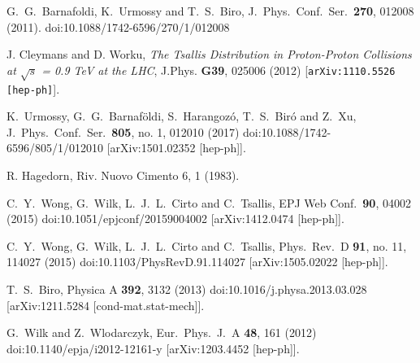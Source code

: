 \documentclass[aps,prd,twocolumn,showpacs,superscriptaddress,groupedaddress]{revtex4}  %
\begin{document}
\begin{thebibliography}{99}
  G.~G.~Barnafoldi, K.~Urmossy and T.~S.~Biro,
  J.\ Phys.\ Conf.\ Ser.\  {\bf 270}, 012008 (2011).
  doi:10.1088/1742-6596/270/1/012008

J. Cleymans and D. Worku,
\emph{The Tsallis Distribution in Proton-Proton Collisions 
at $\sqrt{s}$ = 0.9 TeV at the LHC},                     
J.Phys. {\bf G39}, 025006 (2012)
[{\tt arXiv:1110.5526 [hep-ph]}].

  K.~Urmossy, G.~G.~Barnaföldi, S.~Harangozó, T.~S.~Biró and Z.~Xu,
  J.\ Phys.\ Conf.\ Ser.\  {\bf 805}, no. 1, 012010 (2017)
  doi:10.1088/1742-6596/805/1/012010
  [arXiv:1501.02352 [hep-ph]].


 R. Hagedorn, Riv. Nuovo Cimento 6, 1 (1983).

  C.~Y.~Wong, G.~Wilk, L.~J.~L.~Cirto and C.~Tsallis,
  EPJ Web Conf.\  {\bf 90}, 04002 (2015)
  doi:10.1051/epjconf/20159004002
  [arXiv:1412.0474 [hep-ph]].

  C.~Y.~Wong, G.~Wilk, L.~J.~L.~Cirto and C.~Tsallis,
  Phys.\ Rev.\ D {\bf 91}, no. 11, 114027 (2015)
  doi:10.1103/PhysRevD.91.114027
  [arXiv:1505.02022 [hep-ph]].

  T.~S.~Biro,
  Physica A {\bf 392}, 3132 (2013)
  doi:10.1016/j.physa.2013.03.028
  [arXiv:1211.5284 [cond-mat.stat-mech]].

  G.~Wilk and Z.~Wlodarczyk,
  Eur.\ Phys.\ J.\ A {\bf 48}, 161 (2012)
  doi:10.1140/epja/i2012-12161-y
  [arXiv:1203.4452 [hep-ph]].


\end{thebibliography}
\end{document}
